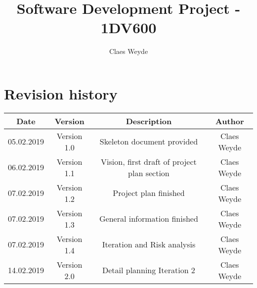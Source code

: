 \documentclass[12pt, letterpaper]{article}
\title{Software Development Project - 1DV600}
\author{Claes Weyde}
\begin{document}
\maketitle
\newpage
\tableofcontents{}
\newpage

\section{Revision history}
\begin{center}
	\begin{tabular}{|c|c|c|c|} 
		\hline
		Date & Version & Description & Author \\ [0.5ex] 
		\hline\hline
		05.02.2019 & Version 1.0 & Skeleton document provided & Claes Weyde \\
		\hline
		06.02.2019 & Version 1.1 & Vision, first draft of project plan section & 
		Claes Weyde \\
		\hline
		07.02.2019 & Version 1.2 & Project plan finished & Claes Weyde \\ [1ex] 
		\hline
		07.02.2019 & Version 1.3 & General information finished & Claes Weyde \\
		\hline
		07.02.2019 & Version 1.4 & Iteration and Risk analysis & Claes Weyde \\ 
		\hline
		14.02.2019 & Version 2.0 & Detail planning Iteration 2 & Claes Weyde \\[1ex]
		\hline
		
	\end{tabular}
\end{center}
\newpage
\end{document}
